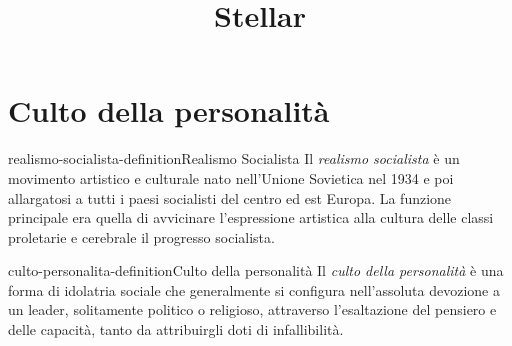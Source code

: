 \documentclass[preview]{standalone}
\begin{document}
\title{Stellar}
\genpage

\section{Culto della personalità}

\begin{snippetdefinition}{realismo-socialista-definition}{Realismo Socialista}
    Il \textit{realismo socialista} è un movimento artistico e culturale nato nell'Unione Sovietica nel 1934 e poi allargatosi a tutti i paesi socialisti del centro ed est Europa. La funzione principale era quella di avvicinare l'espressione artistica alla cultura delle classi proletarie e cerebrale il progresso socialista.
\end{snippetdefinition}

\begin{snippetdefinition}{culto-personalita-definition}{Culto della personalità}
    Il \textit{culto della personalità} è una forma di idolatria sociale che
    generalmente si configura nell'assoluta devozione a un leader,
    solitamente politico o religioso, attraverso l'esaltazione del pensiero e 
    delle capacità, tanto da attribuirgli doti di infallibilità.
\end{snippetdefinition}
\end{document}
